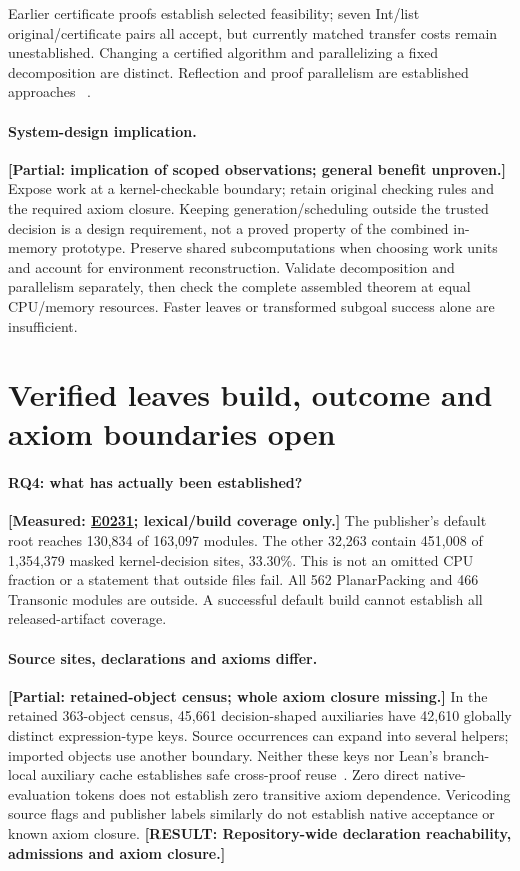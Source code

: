 \documentclass[10pt,twocolumn]{article}
\newcommand{\missing}[1]{\textbf{[RESULT: #1]}}
\newcommand{\measured}[1]{\textbf{[Measured: #1]}}
\newcommand{\partialev}[1]{\textbf{[Partial: #1]}}
\newcommand{\expref}[2]{\href{https://github.com/yunwei37/proofserve/blob/main/docs/tmp/build-and-evaluate/step-#1/step-report.md}{E#2}}
\begin{document}
Earlier certificate proofs establish selected feasibility; seven Int/list
original/certificate pairs all accept, but currently matched transfer costs
remain unestablished.
Changing a certified algorithm and parallelizing a fixed decomposition are
distinct. Reflection and proof parallelism are established approaches
~\cite{mathlib,lean49DecideSource,isabelleBuild2024}.

\paragraph{System-design implication.}
\partialev{implication of scoped observations; general benefit unproven.}
Expose work at a kernel-checkable boundary; retain original checking rules
and the required axiom closure.
Keeping generation/scheduling outside the trusted decision is a design
requirement, not a proved property of the combined in-memory prototype.
Preserve shared subcomputations when choosing work units and account for
environment reconstruction. Validate decomposition and parallelism separately,
then check the complete assembled theorem at equal CPU/memory resources.
Faster leaves or transformed subgoal success alone are insufficient.

\section{Verified leaves build, outcome and axiom boundaries open}
\label{sec:meaning}
\paragraph{RQ4: what has actually been established?}
\measured{\expref{0231-20261101T001556+0000}{0231}; lexical/build coverage only.}
The publisher's default root reaches 130,834 of 163,097 modules.
The other 32,263 contain 451,008 of 1,354,379 masked kernel-decision sites,
33.30\%. This is not an omitted CPU fraction or a statement that outside
files fail. All 562 PlanarPacking and 466 Transonic modules are outside.
A successful default build cannot establish all released-artifact coverage.

\paragraph{Source sites, declarations and axioms differ.}
\partialev{retained-object census; whole axiom closure missing.}
In the retained 363-object census, 45,661 decision-shaped auxiliaries have
42,610 globally distinct expression-type keys.
Source occurrences can expand into several helpers; imported objects use
another boundary. Neither these keys nor Lean's branch-local auxiliary
cache establishes safe cross-proof reuse~\cite{leanAuxLemma434,leanDecide434}.
Zero direct native-evaluation tokens does not establish zero transitive
axiom dependence. Vericoding source flags and publisher labels similarly
do not establish native acceptance or known axiom closure.
\missing{Repository-wide declaration reachability, admissions and axiom closure.}
\end{document}
